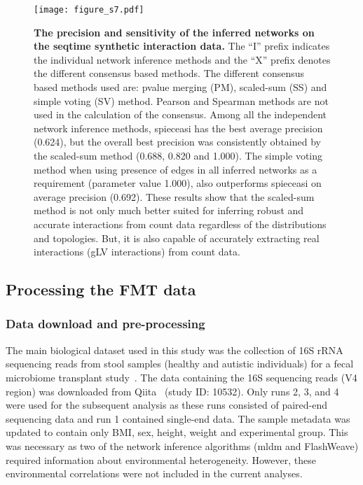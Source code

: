   \begin{figure}[H]
    \centering
    \texttt{[image: figure\_s7.pdf]}
  \end{figure}
  \begin{figure}[H]
    \centering
      \caption{
        \textbf{The precision and sensitivity of the inferred networks on the seqtime synthetic interaction data.}
        The ``I'' prefix indicates the individual network inference methods and the ``X'' prefix denotes the different consensus based methods.
        The different consensus based methods used are: pvalue merging (PM), scaled-sum (SS) and simple voting (SV) method.
        Pearson and Spearman methods are not used in the calculation of the consensus.
        Among all the independent network inference methods, \ac{spieceasi} has the best average precision (0.624), but the overall best precision was consistently obtained by the scaled-sum method (0.688, 0.820 and 1.000).
        The simple voting method when using presence of edges in all inferred networks as a requirement (parameter value 1.000), also outperforms \ac{spieceasi} on average precision (0.692).
        These results show that the scaled-sum method is not only much better suited for inferring robust and accurate interactions from count data regardless of the distributions and topologies.
        But, it is also capable of accurately extracting real interactions (gLV interactions) from count data.
      }
    \label{fig:figure_s7}
  \end{figure}
  \FloatBarrier
  \newpage

  \subsection*{Processing the FMT data}

    \subsubsection*{Data download and pre-processing}
    The main biological dataset used in this study was the collection of 16S rRNA sequencing reads from stool samples (healthy and autistic individuals) for a fecal microbiome transplant study~\cite{Kang2017}.
    The data containing the 16S sequencing reads (V4 region) was downloaded from Qiita~\cite{qiita} (study ID: 10532).
    Only runs 2, 3, and 4 were used for the subsequent analysis as these runs consisted of paired-end sequencing data and run 1 contained single-end data.
    The sample metadata was updated to contain only BMI, sex, height, weight and experimental group.
    This was necessary as two of the network inference algorithms (\ac{mldm} and FlashWeave) required information about environmental heterogeneity.
    However, these environmental correlations were not included in the current analyses.

